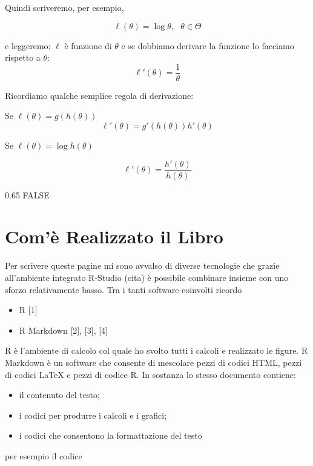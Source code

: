 \documentclass[
  11pt,
]{book}
\providecommand{\tightlist}{%
  \setlength{\itemsep}{0pt}\setlength{\parskip}{0pt}}
\theoremstyle{mytheoremstyle}
\theoremstyle{mydefstyle}
\begin{document}
Quindi scriveremo, per esempio,

\[
\ell(\theta)=\log \theta,~~~ \theta\in\Theta
\]

e leggeremo: \(\ell\) è funzione di \(\theta\) e se dobbiamo derivare la funzione
lo facciamo rispetto a \(\theta\):
\[\ell'(\theta)=\frac{1}\theta\]

Ricordiamo qualche semplice regola di derivazione:

Se \(\ell(\theta)=g(h(\theta))\)
\[
\ell'(\theta)=g'(h(\theta))h'(\theta)
\]

Se \(\ell(\theta)=\log h(\theta)\)

\[
\ell'(\theta)=\frac{h'(\theta)}{h(\theta)}
\]

0.65 FALSE

\chapter{Com'è Realizzato il Libro}\label{comuxe8-realizzato-il-libro}

Per scrivere queste pagine mi sono avvalso di diverse tecnologie che grazie all'ambiente integrato
R-Studio (cita) è possibile combinare insieme con uno sforzo relativamente basso.
Tra i tanti software coinvolti ricordo

\begin{itemize}
\tightlist
\item
  R {[}1{]}
\item
  R Markdown {[}2{]}, {[}3{]}, {[}4{]}
\end{itemize}

R è l'ambiente di calcolo col quale ho svolto tutti i calcoli e realizzato le figure.
R Markdown è un software che consente di mescolare pezzi di codici HTML, pezzi di codici \LaTeX{}
e pezzi di codice R.
In sostanza lo stesso documento contiene:

\begin{itemize}
\tightlist
\item
  il contenuto del testo;
\item
  i codici per produrre i calcoli e i grafici;
\item
  i codici che consentono la formattazione del testo
\end{itemize}

per esempio il codice
\end{document}
